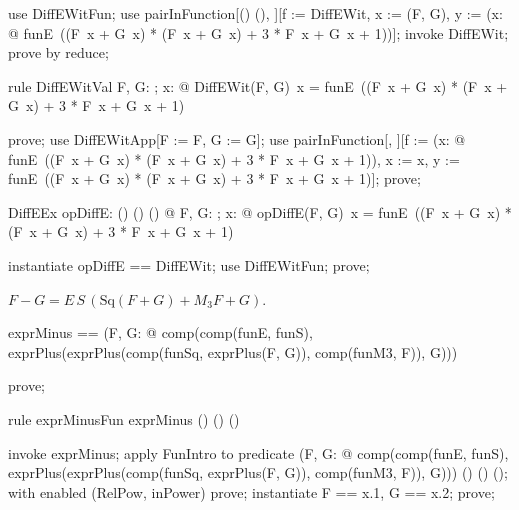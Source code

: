 \documentclass{article}
\begin{document}
\begin{zproof}
use DiffEWitFun;
use pairInFunction[(\nat \fun \nat) \cross (\nat \fun \nat), \nat \fun \nat][f := DiffEWit, x := (F, G), y := (\lambda x: \nat @ funE~((F~x + G~x) * (F~x + G~x) + 3 * F~x + G~x + 1))];
invoke DiffEWit;
prove by reduce;
\end{zproof}

\begin{theorem}{rule DiffEWitVal}
  \forall F, G: \nat \fun \nat; x: \nat @ DiffEWit(F, G)~x = funE~((F~x + G~x) * (F~x + G~x) + 3 * F~x + G~x + 1)
\end{theorem}

\begin{zproof}
prove;
use DiffEWitApp[F := F, G := G];
use pairInFunction[\nat, \nat][f := (\lambda x: \nat @ funE~((F~x + G~x) * (F~x + G~x) + 3 * F~x + G~x + 1)), x := x, y := funE~((F~x + G~x) * (F~x + G~x) + 3 * F~x + G~x + 1)];
prove;
\end{zproof}

\begin{theorem}{DiffEEx}
  \exists opDiffE: (\nat \fun \nat) \cross (\nat \fun \nat) \fun (\nat \fun \nat) @ \forall F, G: \nat \fun \nat; x: \nat @ opDiffE(F, G)~x = funE~((F~x + G~x) * (F~x + G~x) + 3 * F~x + G~x + 1)
\end{theorem}

\begin{zproof}
instantiate opDiffE == DiffEWit;
use DiffEWitFun;
prove;
\end{zproof}

$F - G = E\,S\,(\mathrm{Sq}(F + G) + M_3 F + G)$.

\begin{zed}
  exprMinus == (\lambda F, G: \nat \fun \nat @ comp(comp(funE, funS), exprPlus(exprPlus(comp(funSq, exprPlus(F, G)), comp(funM3, F)), G)))
\end{zed}

\begin{zproof}
prove;
\end{zproof}

\begin{theorem}{rule exprMinusFun}
  exprMinus \in (\nat \fun \nat) \cross (\nat \fun \nat) \fun (\nat \fun \nat)
\end{theorem}

\begin{zproof}
invoke exprMinus;
apply FunIntro to predicate (\lambda F, G: \nat \fun \nat @ comp(comp(funE, funS), exprPlus(exprPlus(comp(funSq, exprPlus(F, G)), comp(funM3, F)), G))) \in (\nat \fun \nat) \cross (\nat \fun \nat) \fun (\nat \fun \nat);
with enabled (RelPow, inPower) prove;
instantiate F == x.1, G == x.2;
prove;
\end{zproof}
\end{document}
